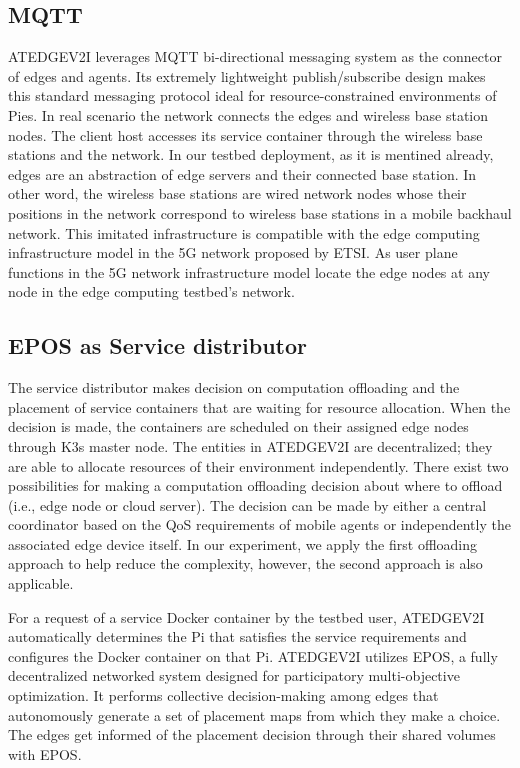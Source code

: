 \documentclass[conference]{IEEEtran}
\begin{document}
\subsection{MQTT}
\par ATEDGEV2I leverages MQTT bi-directional messaging system as the connector of edges and agents. Its extremely lightweight publish/subscribe design makes this standard messaging protocol ideal for resource-constrained environments of Pies. 
In real scenario the network connects the edges and wireless base station nodes. The client host accesses its service container through the wireless base stations and the network. In our testbed deployment, as it is mentined already, edges are an abstraction of edge servers and their connected base station. In other word, the wireless base stations are wired network nodes whose their positions in the network correspond to wireless base stations in a mobile backhaul network. 
This imitated infrastructure is compatible with the edge computing infrastructure model in the 5G network proposed by ETSI\cite{etsi2018white}. As user plane functions in the 5G network infrastructure model  locate the edge nodes at any node in the edge computing testbed’s network.

\subsection{EPOS as Service distributor}
\par The service distributor makes decision on computation offloading and the placement of service containers that are waiting for resource allocation. When the decision is made, the containers are scheduled on their assigned edge nodes through K3s master node. The entities in ATEDGEV2I are decentralized; they are able to allocate resources of their environment independently. There exist two possibilities for making a computation offloading decision about where to offload (i.e., edge node or cloud server). The decision can be made by either a central coordinator based on the QoS requirements of mobile agents or independently the associated edge device itself. In our experiment, we apply the first offloading approach to help reduce the complexity, however, the second approach is also applicable.
\par For a request of a service Docker container by the testbed user, ATEDGEV2I automatically determines the Pi that satisfies the service requirements and configures the Docker container on that Pi. ATEDGEV2I utilizes EPOS\cite{pournaras2018decentralized}, a fully decentralized networked system designed for participatory multi-objective optimization. It performs collective decision-making among edges that autonomously generate a set of placement maps from which they make a choice. The edges get informed of the placement decision through their shared volumes with EPOS.
\end{document}
